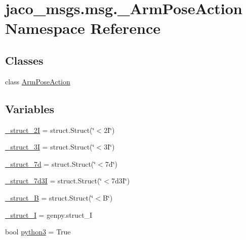 \hypertarget{namespacejaco__msgs_1_1msg_1_1__ArmPoseAction}{}\section{jaco\+\_\+msgs.\+msg.\+\_\+\+Arm\+Pose\+Action Namespace Reference}
\label{namespacejaco__msgs_1_1msg_1_1__ArmPoseAction}
\subsection*{Classes}
\begin{DoxyCompactItemize}
\item 
class \hyperlink{classjaco__msgs_1_1msg_1_1__ArmPoseAction_1_1ArmPoseAction}{Arm\+Pose\+Action}
\end{DoxyCompactItemize}
\subsection*{Variables}
\begin{DoxyCompactItemize}
\item 
\hyperlink{namespacejaco__msgs_1_1msg_1_1__ArmPoseAction_a6b607ccff20d809f92f5b66593afbf2b}{\+\_\+struct\+\_\+2I} = struct.\+Struct(\char`\"{}$<$2\+I\char`\"{})
\item 
\hyperlink{namespacejaco__msgs_1_1msg_1_1__ArmPoseAction_a11678fc4e6bf27a79d7bfb6e1979b212}{\+\_\+struct\+\_\+3I} = struct.\+Struct(\char`\"{}$<$3\+I\char`\"{})
\item 
\hyperlink{namespacejaco__msgs_1_1msg_1_1__ArmPoseAction_aaad2631884bd641947b0edeca27b7956}{\+\_\+struct\+\_\+7d} = struct.\+Struct(\char`\"{}$<$7d\char`\"{})
\item 
\hyperlink{namespacejaco__msgs_1_1msg_1_1__ArmPoseAction_a1f93f507b06f93e869ad7afd037428be}{\+\_\+struct\+\_\+7d3I} = struct.\+Struct(\char`\"{}$<$7d3\+I\char`\"{})
\item 
\hyperlink{namespacejaco__msgs_1_1msg_1_1__ArmPoseAction_ab59a5638df43528a874370a6d310fb69}{\+\_\+struct\+\_\+B} = struct.\+Struct(\char`\"{}$<$B\char`\"{})
\item 
\hyperlink{namespacejaco__msgs_1_1msg_1_1__ArmPoseAction_af2bc9f79d3d398623852812391777c44}{\+\_\+struct\+\_\+I} = genpy.\+struct\+\_\+I
\item 
bool \hyperlink{namespacejaco__msgs_1_1msg_1_1__ArmPoseAction_ad4725f5a042ab6c2532efc8548b24535}{python3} = True
\end{DoxyCompactItemize}


